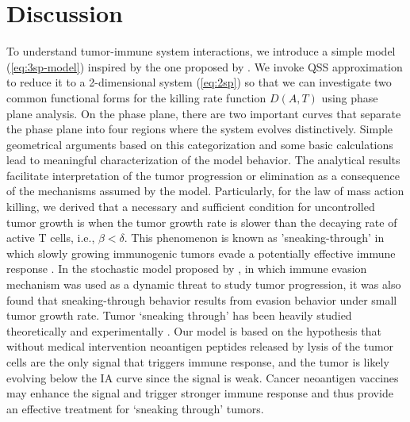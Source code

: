 \documentclass[review,authoryear]{elsarticle}
\begin{document}
\section{Discussion\label{sec:Discussion}}
To understand tumor-immune system interactions, we introduce a simple model (\ref{eq:3sp-model}) inspired by the one proposed by \citet{Messan2021}. We invoke QSS approximation to reduce it to a 2-dimensional system (\ref{eq:2sp}) so that we can investigate two common functional forms for the killing rate function $D(A,T)$ using phase plane analysis. On the phase plane, there are two important curves that separate the phase plane into four regions where the system evolves distinctively. Simple geometrical arguments based on this categorization and some basic
calculations lead to meaningful characterization of the model behavior.
The analytical results facilitate interpretation of the tumor
progression or elimination as a consequence of the mechanisms assumed by the model.
Particularly, for the law of mass action killing, we derived
that a necessary and sufficient condition
for uncontrolled tumor growth is when the tumor growth rate is slower than the
decaying rate of active T cells, i.e., $\beta<\delta$. This phenomenon is known as 'sneaking-through' in which slowly growing immunogenic tumors evade a potentially effective immune response \citet{bocharov2004underwhelming}. In the stochastic model proposed by \cite{George2018}, in which immune evasion mechanism was used as a dynamic threat to study tumor progression, it was also found that sneaking-through behavior results from evasion behavior under small tumor growth rate. Tumor `sneaking through' has been heavily studied theoretically
and experimentally \citep[see e.g.][for a review]{Wilkie2013}. 
 Our model is based on the hypothesis that without medical intervention neoantigen peptides released by lysis of the tumor cells are the only signal that triggers immune response, and the tumor is likely evolving below the IA curve since the signal is weak. Cancer neoantigen vaccines may enhance the signal and trigger stronger immune response and thus provide an effective treatment for `sneaking through' tumors.   
\end{document}
